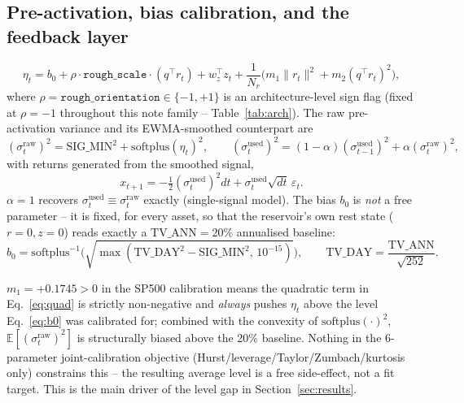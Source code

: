\documentclass[11pt]{article}
\begin{document}
\subsection{Pre-activation, bias calibration, and the feedback layer}
\label{sec:feedback}
\begin{equation}
\eta_t = b_0 + \rho\cdot\texttt{rough\_scale}\cdot(q^\top r_t) + w_z^\top z_t
+ \frac{1}{N_r}\big(m_1\lVert r_t\rVert^2+m_2(q^\top r_t)^2\big),
\label{eq:eta}
\end{equation}
where $\rho=\texttt{rough\_orientation}\in\{-1,+1\}$ is an
architecture-level sign flag (fixed at $\rho=-1$ throughout this note
family -- Table~\ref{tab:arch}). The raw pre-activation variance and
its EWMA-smoothed counterpart are
\begin{equation}
(\sigma_t^{\text{raw}})^2 = \text{SIG\_MIN}^2+\text{softplus}(\eta_t)^2,
\qquad
(\sigma_t^{\text{used}})^2 = (1-\alpha)(\sigma_{t-1}^{\text{used}})^2+\alpha(\sigma_t^{\text{raw}})^2,
\label{eq:sigdef}
\end{equation}
with returns generated from the smoothed signal,
\begin{equation}
x_{t+1} = -\tfrac12(\sigma_t^{\text{used}})^2 dt + \sigma_t^{\text{used}}\sqrt{dt}\,\varepsilon_t.
\label{eq:xdef}
\end{equation}
$\alpha=1$ recovers $\sigma_t^{\text{used}}\equiv\sigma_t^{\text{raw}}$
exactly (single-signal model). The bias $b_0$ is \emph{not} a free
parameter -- it is fixed, for every asset, so that the reservoir's own
rest state ($r=0,z=0$) reads exactly a $\text{TV\_ANN}=20\%$
annualised baseline:
\begin{equation}
b_0 = \text{softplus}^{-1}\Big(\sqrt{\max(\text{TV\_DAY}^2-\text{SIG\_MIN}^2,\,10^{-15})}\Big),
\qquad \text{TV\_DAY}=\frac{\text{TV\_ANN}}{\sqrt{252}}.
\label{eq:b0}
\end{equation}

\begin{note}
$m_1=+0.1745>0$ in the SP500 calibration means the quadratic term in
Eq.~\eqref{eq:quad} is strictly non-negative and \emph{always} pushes
$\eta_t$ above the level Eq.~\eqref{eq:b0} was calibrated for; combined
with the convexity of $\mathrm{softplus}(\cdot)^2$, $\mathbb
E[(\sigma_t^{\text{raw}})^2]$ is structurally biased above the 20\%
baseline. Nothing in the 6-parameter joint-calibration objective
(Hurst/leverage/Taylor/Zumbach/kurtosis only) constrains this -- the
resulting average level is a free side-effect, not a fit target. This
is the main driver of the level gap in Section~\ref{sec:results}.
\end{note}
\end{document}
